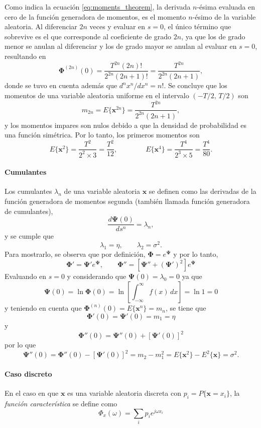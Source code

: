 \documentclass[a4paper]{report}
\newcommand{\x}{\mathbf{x}}
\newcommand{\Phibf}{\mathbf{\Phi}}
\newcommand{\Psibf}{\mathbf{\Psi}}
\begin{document}
Como indica la ecuación \ref{eq:moments_theorem}, la derivada \(n\)-ésima evaluada en cero de la función generadora de momentos, es el momento \(n\)-ésimo de la variable aleatoria. 
Al diferenciar \(2n\) veces y evaluar en \(s=0\), el único término que sobrevive es el que corresponde al coeficiente de grado \(2n\), ya que los de grado menor se anulan al diferenciar y los de grado mayor se anulan al evaluar en \(s=0\), resultando en
\[
  \Phibf^{(2n)}(0)=\frac{T^{2n}(2n)!}{2^{2n}(2n+1)!}=\frac{T^{2n}}{2^{2n}(2n+1)},
\]
donde se tuvo en cuenta además que \(d^nx^n/dx^n=n!\). Se concluye que los momentos de una variable aleatoria uniforme en el intervalo \((-T/2,\,T/2)\) son
\[
 m_{2n}=E\{\x^{2n}\}=\frac{T^{2n}}{2^{2n}(2n+1)},
\]
y los momentos impares son nulos debido a que la densidad de probabilidad es una función simétrica.
Por lo tanto, los primeros momentos son
\[
 E\{\x^2\}=\frac{T^2}{2^2\times3}=\frac{T^2}{12},\qquad\qquad E\{\x^4\}=\frac{T^4}{2^3\times5}=\frac{T^4}{80}.
\]


\paragraph{Cumulantes}

Los cumulantes \(\lambda_n\) de una variable aleatoria \(\x\) se definen como las derivadas de la función generadora de momentos segunda (también llamada función generadora de cumulantes),
\[
 \frac{d\Psibf(0)}{ds^n}=\lambda_n,
\]
y se cumple que 
\begin{equation}\label{eq:cumulants_first_second}
  \lambda_1=\eta,\qquad\lambda_2=\sigma^2.
\end{equation}
Para mostrarlo, se observa que por definición, \(\Phibf=e^{\Psibf}\) y por lo tanto,
\[
 \Phibf'=\Psibf'e^{\Psibf},\qquad \Phibf''=\left[\Psibf''+\left(\Psibf'\right)^2\right]e^{\Psibf}
\]
Evaluando en \(s=0\) y considerando que \(\Psibf(0)=\lambda_0=0\) ya que
\[
 \Psibf(0)=\ln\Phibf(0)=\ln\left[\int_{-\infty}^{\infty}f(x)\,dx\right]=\ln1=0
\]
y teniendo en cuenta que \(\Phibf^{(n)}(0)=E\{\x^n\}=m_n\), se tiene que
\[
 \Phibf'(0)=\Psibf'(0)=m_1=\eta
\]
y
\[
 \Phibf''(0)=\Psibf''(0)+\left[\Psibf'(0)\right]^2
\]
por lo que
\[
 \Psibf''(0)=\Phibf''(0)-\left[\Psibf'(0)\right]^2=m_2-m_1^2=E\{\x^2\}-E^2\{\x\}=\sigma^2.
\]

\paragraph{Caso discreto} En el caso en que \(\x\) es una variable aleatoria discreta con \(p_i=P\{\x=x_i\}\), la \emph{función característica} se define como
\[
 \Phi_x(\omega)=\sum_i p_ie^{j\omega x_i}
\]
\end{document}
